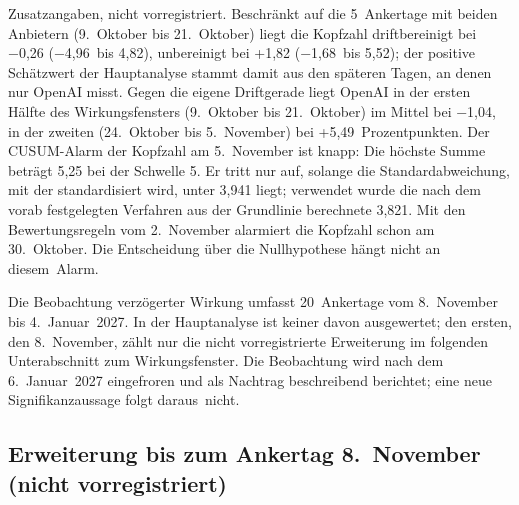 \documentclass[11pt]{article}
\begin{document}
Zusatzangaben, nicht vorregistriert. Beschränkt auf die 5~Ankertage mit beiden Anbietern (9.~Oktober bis 21.~Oktober) liegt die Kopfzahl driftbereinigt bei −0,26 (−4,96~bis 4,82), unbereinigt bei +1,82 (−1,68~bis 5,52); der positive Schätzwert der Hauptanalyse stammt damit aus den späteren Tagen, an denen nur OpenAI misst. Gegen die eigene Driftgerade liegt OpenAI in der ersten Hälfte des Wirkungsfensters (9.~Oktober bis 21.~Oktober) im Mittel bei −1,04, in der zweiten (24.~Oktober bis 5.~November) bei +5,49~Prozentpunkten. Der CUSUM-Alarm der Kopfzahl am 5.~November ist knapp: Die höchste Summe beträgt 5,25 bei der Schwelle 5. Er tritt nur auf, solange die Standardabweichung, mit der standardisiert wird, unter 3,941 liegt; verwendet wurde die nach dem vorab festgelegten Verfahren aus der Grundlinie berechnete 3,821. Mit den Bewertungsregeln vom 2.~November alarmiert die Kopfzahl schon am 30.~Oktober. Die Entscheidung über die Nullhypothese hängt nicht an diesem~\mbox{Alarm.}

Die Beobachtung verzögerter Wirkung umfasst 20~Ankertage vom 8.~November bis 4.~Januar~2027. In der Hauptanalyse ist keiner davon ausgewertet; den ersten, den 8.~November, zählt nur die nicht vorregistrierte Erweiterung im folgenden Unterabschnitt zum Wirkungsfenster. Die Beobachtung wird nach dem 6.~Januar~2027 eingefroren und als Nachtrag beschreibend berichtet; eine neue Signifikanzaussage folgt daraus~\mbox{nicht.}

\subsection{Erweiterung bis zum Ankertag 8.~November (nicht vorregistriert)}
\end{document}
